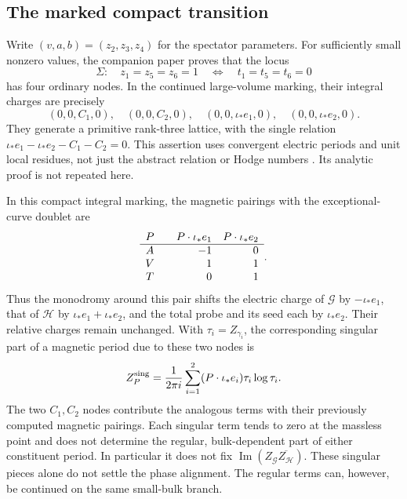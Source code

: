 \subsection{The marked compact transition}
Write $(v,a,b)=(z_2,z_3,z_4)$ for the spectator parameters.
For sufficiently small nonzero values, the companion paper proves
that the locus
\begin{equation}
 \Sigma:\quad z_1=z_5=z_6=1
 \quad\Longleftrightarrow\quad t_1=t_5=t_6=0
 \label{eq:x9-finite-bulk-locus}
\end{equation}
has four ordinary nodes. In the continued large-volume marking,
their integral charges are precisely
\begin{equation}
 (0,0,C_1,0),\quad(0,0,C_2,0),\quad
 (0,0,\iota_*e_1,0),\quad(0,0,\iota_*e_2,0).
 \label{eq:x9-finite-bulk-integral-charges}
\end{equation}
They generate a primitive rank-three lattice, with the single
relation $\iota_*e_1-\iota_*e_2-C_1-C_2=0$.
This assertion uses convergent electric periods and unit local
residues, not just the abstract relation or Hodge numbers
\cite[Section~5.2 and Appendix~C]{Wuebben:2026quantum}.
Its analytic proof is not repeated here.

In this compact integral marking, the magnetic pairings with the
exceptional-curve doublet are
\begin{equation}
 \begin{array}{c@{\qquad}rr}
 P&P\cdot\iota_*e_1&P\cdot\iota_*e_2\\\hline
 A&-1&0\\V&1&1\\T&0&1
 \end{array}.
 \label{eq:x9-local-probe-pairings}
\end{equation}
Thus the monodromy around this pair shifts the electric charge of
$\mathcal G$ by $-\iota_*e_1$, that of $\mathcal H$ by
$\iota_*e_1+\iota_*e_2$, and the total probe and its seed each
by $\iota_*e_2$. Their relative charges remain unchanged.
With $\tau_i=Z_{\gamma_i}$, the corresponding singular part of
a magnetic period due to these two nodes is
\begin{equation}
 Z_P^{\rm sing}=
 \frac1{2\pi i}\sum_{i=1}^2(P\cdot\iota_*e_i)
                 \tau_i\log\tau_i.
 \label{eq:x9-local-magnetic-singular-part}
\end{equation}
The two $C_1,C_2$ nodes contribute the analogous terms with their
previously computed magnetic pairings. Each singular term tends
to zero at the massless point and does not determine the
regular, bulk-dependent part of either constituent period.
In particular it does not fix
$\operatorname{Im}(Z_{\mathcal G}\overline{Z_{\mathcal H}})$.
These singular pieces alone do not settle the phase alignment.
The regular terms can, however, be continued on the same
small-bulk branch.

